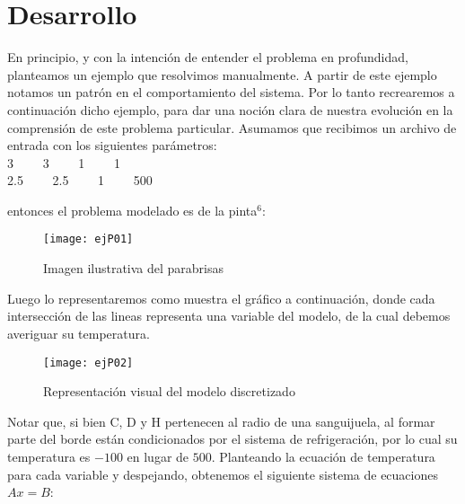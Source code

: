 \section{Desarrollo}

En principio, y con la intención de entender el problema en profundidad, planteamos un ejemplo que resolvimos manualmente. A partir de este ejemplo notamos un patrón en el comportamiento del sistema. Por lo tanto recrearemos a continuación dicho ejemplo, para dar una noción clara de nuestra evolución en la comprensión de este problema particular. Asumamos que recibimos un archivo de entrada con los siguientes parámetros:\\

3 \ \ \ \   3  \ \ \ \ 1 \ \ \ \ 1\\
2.5  \ \ \ \ 2.5 \ \ \ \ 1  \ \ \ \ 500

entonces el problema modelado es de la pinta$^6$:

\begin{figure}[h]
    \centering
    \texttt{[image: ejP01]}
    \caption{Imagen ilustrativa del parabrisas}
\end{figure}

Luego lo representaremos como muestra el gráfico a continuación, donde cada intersección de las lineas representa una variable del modelo, de la cual debemos averiguar su temperatura.

\begin{figure}[h]
    \centering
    \texttt{[image: ejP02]}
    \caption{Representación visual del modelo discretizado}
\end{figure}

Notar que, si bien C, D y H pertenecen al radio de una sanguijuela, al formar parte del borde están condicionados por el sistema de refrigeración, por lo cual su temperatura es $-100$ en lugar de $500$. Planteando la ecuación de temperatura para cada variable y despejando, obtenemos el siguiente sistema de ecuaciones $Ax=B$:


